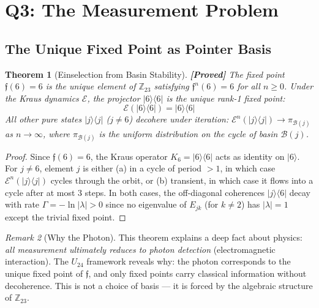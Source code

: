 \documentclass[12pt,a4paper]{article}
\newcommand{\proved}[1]{\textcolor{proved}{\textbf{[Proved]}} #1}
\newtheorem{theorem}{Theorem}[section]
\theoremstyle{definition}
\theoremstyle{remark}
\newtheorem{remark}[theorem]{Remark}
\newcommand{\Reeds}{\mathfrak{f}}
\newcommand{\Zp}{\mathbb{Z}_{23}}
\newcommand{\Kraus}{\mathcal{E}}
\newcommand{\Basin}{\mathcal{B}}
\begin{document}
\section{Q3: The Measurement Problem}
\label{sec:measurement}

\subsection{The Unique Fixed Point as Pointer Basis}

\begin{theorem}[Einselection from Basin Stability]
\label{thm:einselection}
\proved{The fixed point $\Reeds(6) = 6$ is the \emph{unique} element of $\Zp$
satisfying $\Reeds^n(6) = 6$ for all $n \geq 0$. Under the Kraus dynamics
$\Kraus$, the projector $|6\rangle\langle 6|$ is the unique rank-1 fixed point:}
\begin{equation}
  \Kraus(|6\rangle\langle 6|) = |6\rangle\langle 6|
\end{equation}
All other pure states $|j\rangle\langle j|$ ($j \neq 6$) decohere under
iteration: $\Kraus^n(|j\rangle\langle j|) \to \pi_{\Basin(j)}$ as $n \to \infty$,
where $\pi_{\Basin(j)}$ is the uniform distribution on the cycle of basin $\Basin(j)$.
\end{theorem}

\begin{proof}
Since $\Reeds(6) = 6$, the Kraus operator $K_6 = |6\rangle\langle 6|$ acts as
identity on $|6\rangle$. For $j \neq 6$, element $j$ is either (a) in a cycle of
period $> 1$, in which case $\Kraus^n(|j\rangle\langle j|)$ cycles through the
orbit, or (b) transient, in which case it flows into a cycle after at most 3
steps. In both cases, the off-diagonal coherences $|j\rangle\langle 6|$ decay
with rate $\Gamma = -\ln|\lambda| > 0$ since no eigenvalue of $E_{jk}$ (for
$k \neq 2$) has $|\lambda| = 1$ except the trivial fixed point.
\end{proof}

\begin{remark}[Why the Photon]
This theorem explains a deep fact about physics: \emph{all measurement ultimately
reduces to photon detection} (electromagnetic interaction). The $U_{24}$ framework
reveals why: the photon corresponds to the unique fixed point of $\Reeds$, and
only fixed points carry classical information without decoherence. This is not a
choice of basis --- it is forced by the algebraic structure of $\Zp$.
\end{remark}
\end{document}
